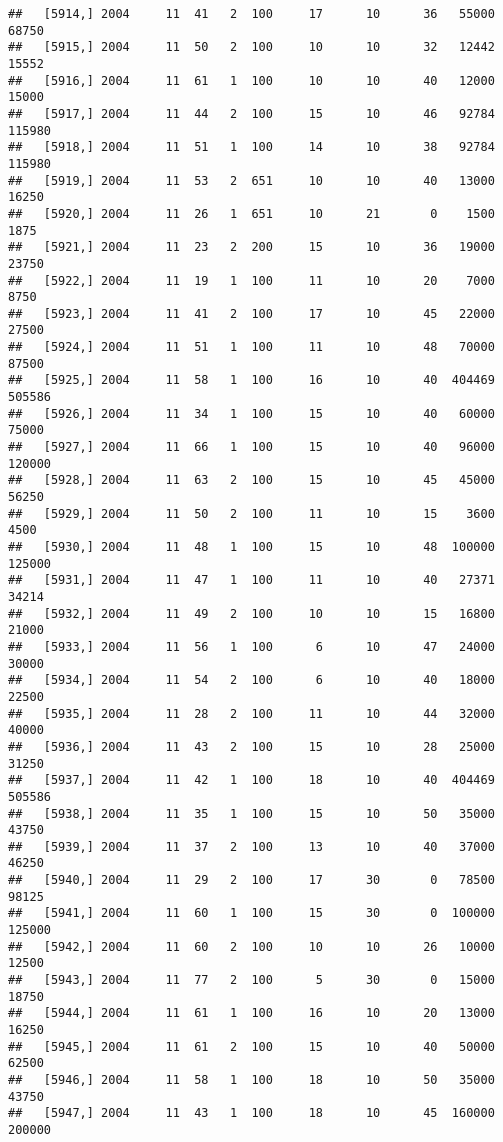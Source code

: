 \documentclass{article}\usepackage[]{graphicx}\usepackage[]{color}
\makeatletter
\newenvironment{kframe}{%
 \def\at@end@of@kframe{}%
 \ifinner\ifhmode%
  \def\at@end@of@kframe{\end{minipage}}%
  \begin{minipage}{\columnwidth}%
 \fi\fi%
 \def\FrameCommand##1{\hskip\@totalleftmargin \hskip-\fboxsep
 \colorbox{shadecolor}{##1}\hskip-\fboxsep
     \hskip-\linewidth \hskip-\@totalleftmargin \hskip\columnwidth}%
 \MakeFramed {\advance\hsize-\width
   \@totalleftmargin\z@ \linewidth\hsize
   \@setminipage}}%
 {\par\unskip\endMakeFramed%
 \at@end@of@kframe}
\newenvironment{knitrout}{}{} %
\makeatother
\begin{document}
\begin{knitrout}
\begin{kframe}
\begin{verbatim}
##   [5914,] 2004     11  41   2  100     17      10      36   55000   68750
##   [5915,] 2004     11  50   2  100     10      10      32   12442   15552
##   [5916,] 2004     11  61   1  100     10      10      40   12000   15000
##   [5917,] 2004     11  44   2  100     15      10      46   92784  115980
##   [5918,] 2004     11  51   1  100     14      10      38   92784  115980
##   [5919,] 2004     11  53   2  651     10      10      40   13000   16250
##   [5920,] 2004     11  26   1  651     10      21       0    1500    1875
##   [5921,] 2004     11  23   2  200     15      10      36   19000   23750
##   [5922,] 2004     11  19   1  100     11      10      20    7000    8750
##   [5923,] 2004     11  41   2  100     17      10      45   22000   27500
##   [5924,] 2004     11  51   1  100     11      10      48   70000   87500
##   [5925,] 2004     11  58   1  100     16      10      40  404469  505586
##   [5926,] 2004     11  34   1  100     15      10      40   60000   75000
##   [5927,] 2004     11  66   1  100     15      10      40   96000  120000
##   [5928,] 2004     11  63   2  100     15      10      45   45000   56250
##   [5929,] 2004     11  50   2  100     11      10      15    3600    4500
##   [5930,] 2004     11  48   1  100     15      10      48  100000  125000
##   [5931,] 2004     11  47   1  100     11      10      40   27371   34214
##   [5932,] 2004     11  49   2  100     10      10      15   16800   21000
##   [5933,] 2004     11  56   1  100      6      10      47   24000   30000
##   [5934,] 2004     11  54   2  100      6      10      40   18000   22500
##   [5935,] 2004     11  28   2  100     11      10      44   32000   40000
##   [5936,] 2004     11  43   2  100     15      10      28   25000   31250
##   [5937,] 2004     11  42   1  100     18      10      40  404469  505586
##   [5938,] 2004     11  35   1  100     15      10      50   35000   43750
##   [5939,] 2004     11  37   2  100     13      10      40   37000   46250
##   [5940,] 2004     11  29   2  100     17      30       0   78500   98125
##   [5941,] 2004     11  60   1  100     15      30       0  100000  125000
##   [5942,] 2004     11  60   2  100     10      10      26   10000   12500
##   [5943,] 2004     11  77   2  100      5      30       0   15000   18750
##   [5944,] 2004     11  61   1  100     16      10      20   13000   16250
##   [5945,] 2004     11  61   2  100     15      10      40   50000   62500
##   [5946,] 2004     11  58   1  100     18      10      50   35000   43750
##   [5947,] 2004     11  43   1  100     18      10      45  160000  200000

\end{verbatim}
\end{kframe}
\end{knitrout}
\end{document}
